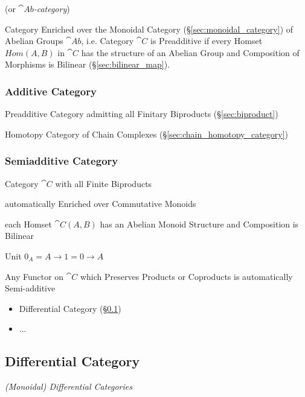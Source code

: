 (or \emph{$\cat{Ab}$-category})

Category Enriched over the Monoidal Category (\S\ref{sec:monoidal_category}) of
Abelian Groups $\cat{Ab}$, i.e. Category $\cat{C}$ is Preadditive if every
Homset $Hom(A,B)$ in $\cat{C}$ has the structure of an Abelian Group and
Composition of Morphisms is Bilinear (\S\ref{sec:bilinear_map}).



\subsubsection{Additive Category}\label{sec:additive_category}

Preadditive Category admitting all Finitary Biproducts
(\S\ref{sec:biproduct})

\fist Homotopy Category of Chain Complexes (\S\ref{sec:chain_homotopy_category})



\subsubsection{Semiadditive Category}\label{sec:semiadditive_category}

Category $\cat{C}$ with all Finite Biproducts

automatically Enriched over Commutative Monoids

each Homset $\cat{C}(A,B)$ has an Abelian Monoid Structure and
Composition is Bilinear

Unit $0_A = A \rightarrow 1 = 0 \rightarrow A$

Any Functor on $\cat{C}$ which Preserves Products or Coproducts is
automatically Semi-additive


\begin{itemize}
  \item Differential Category (\S\ref{sec:differential_category})
  \item ...
\end{itemize}



\subsection{Differential Category}\label{sec:differential_category}

\emph{(Monoidal) Differential Categories}

